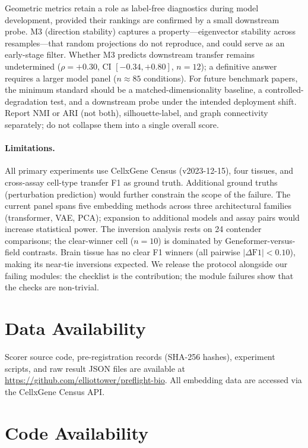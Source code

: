 \documentclass[11pt]{article}
\begin{document}
Geometric metrics retain a role as label-free diagnostics during model development, provided their rankings are confirmed by a small downstream probe. M3 (direction stability) captures a property---eigenvector stability across resamples---that random projections do not reproduce, and could serve as an early-stage filter. Whether M3 predicts downstream transfer remains undetermined ($\rho = +0.30$, CI $[-0.34, +0.80]$, $n = 12$); a definitive answer requires a larger model panel ($n \approx 85$ conditions). For future benchmark papers, the minimum standard should be a matched-dimensionality baseline, a controlled-degradation test, and a downstream probe under the intended deployment shift. Report NMI or ARI (not both), silhouette-label, and graph connectivity separately; do not collapse them into a single overall score.

\paragraph{Limitations.} All primary experiments use CellxGene Census (v2023-12-15), four tissues, and cross-assay cell-type transfer F1 as ground truth. Additional ground truths (perturbation prediction) would further constrain the scope of the failure. The current panel spans five embedding methods across three architectural families (transformer, VAE, PCA); expansion to additional models and assay pairs would increase statistical power. The inversion analysis rests on 24 contender comparisons; the clear-winner cell ($n = 10$) is dominated by Geneformer-versus-field contrasts. Brain tissue has no clear F1 winners (all pairwise $|\Delta\text{F1}| < 0.10$), making its near-tie inversions expected. We release the protocol alongside our failing modules: the checklist is the contribution; the module failures show that the checks are non-trivial.

\section*{Data Availability}

Scorer source code, pre-registration records (SHA-256 hashes), experiment scripts, and raw result JSON files are available at \url{https://github.com/elliottower/preflight-bio}. All embedding data are accessed via the CellxGene Census API.

\section*{Code Availability}
\end{document}
